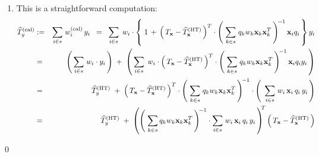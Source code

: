 \begin{enumerate}
\begin{eqnarray*}
                \;\right)^{\!\!-1}
    \end{eqnarray*}
    Hence,
    \begin{eqnarray*}
    w_{i}^{\textnormal{(cal)}}
    & = &
        w_{i}\cdot\left(\;
            1 + \lambda^{T} \cdot \mathbf{x}_{i}\,q_{i}
            \;\right)
    \;\; = \;\;
        w_{i}\cdot\left\{\;
            1
            \,+\,
            \left(\,T_{\mathbf{x}} - \widehat{T}_{\mathbf{x}}^{\textnormal{(HT)}}\,\right)^{T}
            \cdot
            \left(\;
                \underset{k \in s}{\sum}\;\,q_{k}\,w_{k}\cdot\mathbf{x}_{k}\cdot\mathbf{x}_{k}^{T}
                \,\right)^{\!-1}
            \mathbf{x}_{i}\,q_{i}
            \,\right\}
    \end{eqnarray*}
\item
    This is a straightforward computation:
    \begin{eqnarray*}
    \widehat{T}_{y}^{\textnormal{(cal)}}
    & := &
        \underset{i \in s}{\sum}\;
        w^{\textnormal{(cal)}}_{i}\,y_{i}
    \;\; = \;\;
        \underset{i \in s}{\sum}\;\,
        w_{i}\cdot\left\{\;
            1
            \,+\,
            \left(\,T_{\mathbf{x}} - \widehat{T}_{\mathbf{x}}^{\textnormal{(HT)}}\,\right)^{T}
            \cdot
            \left(\;
                \underset{k \in s}{\sum}\;q_{k}w_{k}\mathbf{x}_{k}\mathbf{x}_{k}^{T}
                \,\right)^{\!-1}
            \mathbf{x}_{i}q_{i}
            \,\right\}
        y_{i}
    \\
    & = &
        \left(\,\underset{i \in s}{\sum}\;w_{i} \cdot y_{i}\,\right)
        \; + \;
        \left(\,
            \underset{i \in s}{\sum}\;\,
            w_{i}\cdot
                \left(\,T_{\mathbf{x}} - \widehat{T}_{\mathbf{x}}^{\textnormal{(HT)}}\,\right)^{T}
                \cdot
                \left(\;
                    \underset{k \in s}{\sum}\;q_{k}w_{k}\mathbf{x}_{k}\mathbf{x}_{k}^{T}
                    \,\right)^{\!-1}
                \mathbf{x}_{i}q_{i}
            y_{i}
            \,\right)
    \\
    & = &
        \widehat{T}^{\textnormal{(HT)}}_{y}
        \; + \;
        \left(\,T_{\mathbf{x}} - \widehat{T}_{\mathbf{x}}^{\textnormal{(HT)}}\,\right)^{T}
        \cdot
        \left(\;
            \underset{k \in s}{\sum}\;q_{k}w_{k}\mathbf{x}_{k}\mathbf{x}_{k}^{T}
            \,\right)^{\!-1}
        \cdot
        \left(\;\,
            \underset{i \in s}{\sum}\;
            w_{i}\,\mathbf{x}_{i}\,q_{i}\,y_{i}
            \,\right)
    \\
    & = &
        \widehat{T}^{\textnormal{(HT)}}_{y}
        \; + \;
        \left(
            \left(\;
                \underset{k \in s}{\sum}\,q_{k}w_{k}\mathbf{x}_{k}\mathbf{x}_{k}^{T}
                \,\right)^{\!-1}
            \cdot
            \underset{i \in s}{\sum}\;
            w_{i}\,\mathbf{x}_{i}\,q_{i}\,y_{i}
            \,\right)^{\!\!T}
        \left(\,T_{\mathbf{x}} - \widehat{T}_{\mathbf{x}}^{\textnormal{(HT)}}\,\right)
    \end{eqnarray*}
\end{enumerate}
\qed

